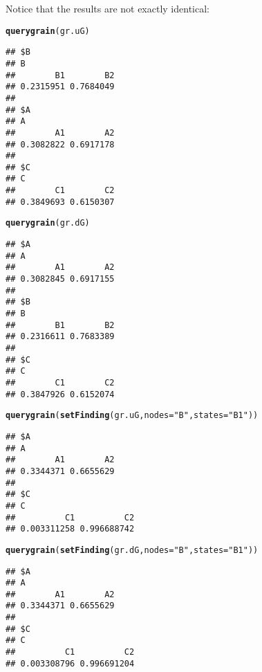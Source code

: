 \documentclass[10pt]{article}\usepackage[]{graphicx}\usepackage[]{color}
\makeatletter
\newcommand{\hlstr}[1]{\textcolor[rgb]{0.192,0.494,0.8}{#1}}%
\newcommand{\hlstd}[1]{\textcolor[rgb]{0.345,0.345,0.345}{#1}}%
\newcommand{\hlkwc}[1]{\textcolor[rgb]{0.333,0.667,0.333}{#1}}%
\newcommand{\hlkwd}[1]{\textcolor[rgb]{0.737,0.353,0.396}{\textbf{#1}}}%
\newenvironment{kframe}{%
 \def\at@end@of@kframe{}%
 \ifinner\ifhmode%
  \def\at@end@of@kframe{\end{minipage}}%
  \begin{minipage}{\columnwidth}%
 \fi\fi%
 \def\FrameCommand##1{\hskip\@totalleftmargin \hskip-\fboxsep
 \colorbox{shadecolor}{##1}\hskip-\fboxsep
     \hskip-\linewidth \hskip-\@totalleftmargin \hskip\columnwidth}%
 \MakeFramed {\advance\hsize-\width
   \@totalleftmargin\z@ \linewidth\hsize
   \@setminipage}}%
 {\par\unskip\endMakeFramed%
 \at@end@of@kframe}
\newenvironment{knitrout}{}{} %
\makeatother
\begin{document}
Notice that the results are not exactly identical:

\begin{knitrout}
\color{fgcolor}\begin{kframe}
\begin{alltt}
\hlkwd{querygrain}\hlstd{(gr.uG)}
\end{alltt}
\begin{verbatim}
## $B
## B
##        B1        B2 
## 0.2315951 0.7684049 
## 
## $A
## A
##        A1        A2 
## 0.3082822 0.6917178 
## 
## $C
## C
##        C1        C2 
## 0.3849693 0.6150307
\end{verbatim}
\begin{alltt}
\hlkwd{querygrain}\hlstd{(gr.dG)}
\end{alltt}
\begin{verbatim}
## $A
## A
##        A1        A2 
## 0.3082845 0.6917155 
## 
## $B
## B
##        B1        B2 
## 0.2316611 0.7683389 
## 
## $C
## C
##        C1        C2 
## 0.3847926 0.6152074
\end{verbatim}
\end{kframe}
\end{knitrout}


\begin{knitrout}
\color{fgcolor}\begin{kframe}
\begin{alltt}
\hlkwd{querygrain}\hlstd{(}\hlkwd{setFinding}\hlstd{(gr.uG,} \hlkwc{nodes}\hlstd{=}\hlstr{"B"}\hlstd{,} \hlkwc{states}\hlstd{=}\hlstr{"B1"}\hlstd{))}
\end{alltt}
\begin{verbatim}
## $A
## A
##        A1        A2 
## 0.3344371 0.6655629 
## 
## $C
## C
##          C1          C2 
## 0.003311258 0.996688742
\end{verbatim}
\begin{alltt}
\hlkwd{querygrain}\hlstd{(}\hlkwd{setFinding}\hlstd{(gr.dG,} \hlkwc{nodes}\hlstd{=}\hlstr{"B"}\hlstd{,} \hlkwc{states}\hlstd{=}\hlstr{"B1"}\hlstd{))}
\end{alltt}
\begin{verbatim}
## $A
## A
##        A1        A2 
## 0.3344371 0.6655629 
## 
## $C
## C
##          C1          C2 
## 0.003308796 0.996691204
\end{verbatim}
\end{kframe}
\end{knitrout}



\end{document}
